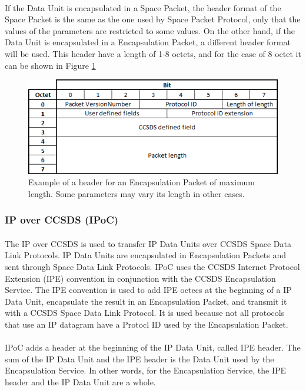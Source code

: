 \paragraph{}If the Data Unit is encapsulated in a Space Packet, the header format of the Space Packet is the same as the one used by Space Packet Protocol, only that the values of the parameters are restricted to some values. On the other hand, if the Data Unit is encapsulated in a Encapsulation Packet, a different header format will be used. This header have a length of 1-8 octets, and for the case of 8 octet it can be shown in Figure \ref{fig:ESheader}
\begin{figure}[H]
\begin{center}
\includegraphics[scale=1]{ES_header.PNG}
\caption[Encapsulation header]{Example of a header for an Encapsulation Packet of maximum length. Some parameters may vary its length in other cases.}
\label{fig:ESheader}
\end{center}
\end{figure}

\subsubsection*{IP over CCSDS (IPoC)\cite{IPoC}}
\paragraph{}The IP over CCSDS is used to transfer IP Data Units over CCSDS Space Data Link Protocols. IP Data Units are encapsulated in Encapsulation Packets and sent through Space Data Link Protocols. IPoC uses the CCSDS Internet Protocol
Extension (IPE) convention in conjunction with the CCSDS Encapsulation Service. The IPE convention is used to add IPE octecs at the beginning of a IP Data Unit, encapsulate the result in an Encapsulation Packet, and transmit it with a CCSDS Space Data Link Protocol. It is used because not all protocols that use an IP datagram have a Protocl ID used by the Encapsulation Packet.
\paragraph{}IPoC adds a header at the beginning of the IP Data Unit, called IPE header. The sum of the IP Data Unit and the IPE header is the Data Unit used by the Encapsulation Service. In other words, for the Encapsulation Service, the IPE header and the IP Data Unit are a whole.
